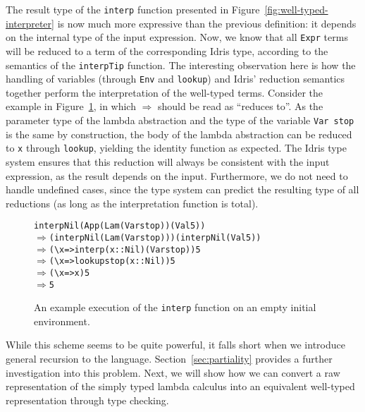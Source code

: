 The result type of the \texttt{interp} function presented in Figure~\ref{fig:well-typed-interpreter} is now much more expressive than the previous definition: it depends on the internal type of the input expression. Now, we know that all \texttt{Expr} terms will be reduced to a term of the corresponding Idris type, according to the semantics of the \texttt{interpTip} function. The interesting observation here is how the handling of variables (through \texttt{Env} and \texttt{lookup}) and Idris' reduction semantics together perform the interpretation of the well-typed terms. Consider the example in Figure~\ref{fig:well-typed-interpreter-example}, in which $\Rightarrow$ should be read as ``reduces to''. As the parameter type of the lambda abstraction and the type of the variable \texttt{Var stop} is the same by construction, the body of the lambda abstraction can be reduced to \texttt{x} through \texttt{lookup}, yielding the identity function as expected. The Idris type system ensures that this reduction will always be consistent with the input expression, as the result depends on the input. Furthermore, we do not need to handle undefined cases, since the type system can predict the resulting type of all reductions (as long as the interpretation function is total).

\begin{figure}
\begin{alltt}
interp Nil (App (Lam (Var stop)) (Val 5))
\(\Rightarrow\) (interp Nil (Lam (Var stop))) (interp Nil (Val 5))
\(\Rightarrow\) (\textbackslash{x} => interp (x :: Nil) (Var stop)) 5
\(\Rightarrow\) (\textbackslash{x} => lookup stop (x :: Nil)) 5
\(\Rightarrow\) (\textbackslash{x} => x) 5
\(\Rightarrow\) 5
\end{alltt}
\caption{An example execution of the \texttt{interp} function on an empty initial environment.}
\label{fig:well-typed-interpreter-example}
\end{figure}

While this scheme seems to be quite powerful, it falls short when we introduce general recursion to the language. Section~\ref{sec:partiality} provides a further investigation into this problem. Next, we will show how we can convert a raw representation of the simply typed lambda calculus into an equivalent well-typed representation through type checking.